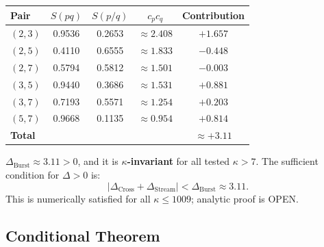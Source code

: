\documentclass[11pt]{article}
\newcommand{\Dburstvar}{\Delta_{\mathrm{Burst}}}
\newcommand{\Dcross}{\Delta_{\mathrm{Cross}}}
\newcommand{\Dstream}{\Delta_{\mathrm{Stream}}}
\begin{document}
\begin{center}
\begin{tabular}{lcccc}
\toprule
Pair & $S(pq)$ & $S(p/q)$ & $c_p c_q$ & Contribution \\
\midrule
$(2,3)$ & 0.9536 & 0.2653 & $\approx 2.408$ & $+1.657$ \\
$(2,5)$ & 0.4110 & 0.6555 & $\approx 1.833$ & $-0.448$ \\
$(2,7)$ & 0.5794 & 0.5812 & $\approx 1.501$ & $-0.003$ \\
$(3,5)$ & 0.9440 & 0.3686 & $\approx 1.531$ & $+0.881$ \\
$(3,7)$ & 0.7193 & 0.5571 & $\approx 1.254$ & $+0.203$ \\
$(5,7)$ & 0.9668 & 0.1135 & $\approx 0.954$ & $+0.814$ \\
\midrule
\textbf{Total} & & & & $\mathbf{\approx +3.11}$ \\
\bottomrule
\end{tabular}
\end{center}

$\Dburstvar\approx 3.11 > 0$, and it is \textbf{$\kappa$-invariant}
for all tested $\kappa > 7$.
The sufficient condition for $\Delta > 0$ is:
\[
|\Dcross + \Dstream| < \Dburstvar \approx 3.11.
\]
This is numerically satisfied for all $\kappa\leq 1009$;
analytic proof is OPEN.

\subsection{Conditional Theorem}
\end{document}
